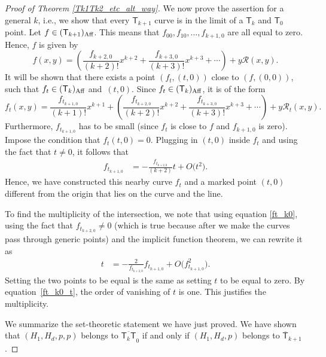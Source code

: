 \begin{proof}[Proof of Theorem \ref{Tk1Tk2_etc_alt_way}]
We now prove the assertion for a general $k$,
i.e., we show that
every $\mathsf{T}_{k+1}$ curve is in the limit of a $\mathsf{T}_{k}$
and $\mathsf{T}_0$ point.
Let $f \in (\mathsf{T}_{k+1})_{\textnormal{Aff}}$.
This means that $f_{00}, f_{10}, \dots, f_{k+1,0}$ are all equal to zero.
Hence, $f$ is given by
\[
f(x, y)  =  \left(\frac{f_{k+2,0}}{(k+2)!} x^{k+2} +
\frac{f_{k+3,0}}{(k+3)!} x^{k+3} + \cdots\right) + y \mathcal{R}(x, y).
\]
It will be shown that there exists a point $(f_t, (t, 0))$ close to $(f, (0, 0))$, such that
$f_t \in (\mathsf{T}_{k})_{\textnormal{Aff}}$
and~$(t, 0)$.
Since $f_t \in (\mathsf{T}_{k})_{\textnormal{Aff}}$,
it is of the form
\[
f_t(x, y) = \frac{f_{t_{k+1, 0}}}{(k+1)!}x^{k+1}+
\left(\frac{f_{t_{k+2, 0}}}{(k+2)!} x^{k+2} + \frac{f_{t_{k+3,0}}}{(k+3)!} x^{k+3} +\cdots\right) +
y \mathcal{R}_t(x, y).
\]
Furthermore, $f_{t_{k+1, 0}}$ has to be small (since $f_t$ is close to $f$ and $f_{k+1, 0}$ is zero).
Impose the condition that $f_{t}(t, 0) = 0$. Plugging in $(t, 0)$ inside $f_t$ and using the fact
that $t \neq 0$, it follows that
\begin{align}
f_{t_{k+1, 0}}&= -\frac{f_{t_{k+2, 0}}}{(k+2)} t + O\bigl(t^2\bigr). \label{ft_k0}
\end{align}
Hence, we have constructed this nearby curve $f_t$ and a marked point $(t, 0)$ different from the origin
that lies on the curve and the line.

To find the multiplicity of the intersection, we note that using equation \eqref{ft_k0},
using the fact that $f_{t_{k+2, 0}} \neq 0$ (which is true because after we make the curves
pass through generic points)
and the implicit function theorem, we can rewrite it as
\begin{align}
t & = -\frac{2}{f_{t_{k+2, 0}}} f_{t_{k+1, 0}} + O\bigl(f_{t_{k+1, 0}}^2\bigr). \label{ft_k0_t}
\end{align}
Setting the two points to be equal is the same as setting $t$ to be equal to zero.
By equation~\eqref{ft_k0_t}, the order of vanishing of $t$ is one. This
justifies the multiplicity.

We summarize the set-theoretic statement we have just proved.
We have shown that $(H_1, H_d,\allowbreak  p, p)$ belongs to $\overline{\mathsf{T}_k \mathsf{T}}_0$
if and only if $(H_1, H_d, p)$ belongs to $\overline{\mathsf{T}}_{k+1}$.


\end{proof}
